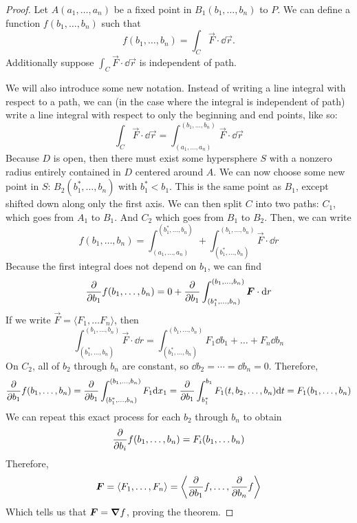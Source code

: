 \begin{proof}
    
    Let $A(a_1, \dots, a_n)$ be a fixed point in $B_1(b_1, \dots, b_n)$ to $P$. We can define a function $f(b_1, \dots, b_n)$ such that
    \[ f(b_1, \dots, b_n) = \int_C \vec F\cdot \dd \vec r.\]
    Additionally suppose $\int_C\vec F \cdot \dd \vec r$ is independent of path. \par 
    We will also introduce some new notation. Instead of writing a line integral with respect to a path, we can (in the case where the integral is independent of path) write a line integral with respect to only the beginning and end points, like so:
    \[ \int_C \vec F \cdot \dd \vec r = \int_{(a_1, \dots, a_n)}^{(b_1, \dots, b_n)}\vec F \cdot \dd \vec r\]
    Because $D$ is open, then there must exist some hypersphere $S$ with a nonzero radius entirely contained in $D$ centered around $A$. We can now choose some new point in $S$: $B_2(b_1^*, \dots, b_n)$ with $b_1^*<b_1$. This is the same point as $B_1$, except shifted down along only the first axis. We can then split $C$ into two paths: $C_1$, which goes from $A_1$ to $B_1$. And $C_2$ which goes from $B_1$ to $B_2$. Then, we can write
    \[ f(b_1, \dots, b_n) = \int_{(a_1, \dots, a_n)}^{(b_1^*, \dots, b_n)} + \int_{(b_1^*, \dots, b_n)}^{(b_1, \dots, b_n)}\vec F \cdot \dd r\]
    Because the first integral does not depend on $b_1$, we can find
    \[ \pdv{b_1}f(b_1, \dots, b_n) = 0 + \pdv{b_1} \int_{(b_1^*, \dots, b_n)}^{(b_1, \dots, b_n)}\boldsymbol{F} \cdot \dd r \]
    If we write $\vec F = \langle F_1, \dots F_n\rangle$, then
    \[  \int_{(b_1^*, \dots, b_n)}^{(b_1, \dots, b_n)}\vec F \cdot \dd r =  \int_{(b_1^*, \dots, b_n)}^{(b_1, \dots, b_n)}F_1\dd b_1 + \dots + F_n\dd b_n\]
    On $C_2$, all of $b_2$ through $b_n$ are constant, so $\dd b_2 = \cdots = \dd b_n = 0$. Therefore,
    \[ \pdv{b_1}f(b_1, \dots, b_n) = \pdv{b_1}\int_{(b_1^*, \dots, b_n)}^{(b_1, \dots, b_n)}F_1\dd x_1 = \pdv{b_1}\int_{b_1^*}^{b_1}F_1(t, b_2, \dots, b_n)\dd t = F_1(b_1, \dots, b_n) \]
    We can repeat this exact process for each $b_2$ through $b_n$ to obtain
    \[ \pdv{b_i}f(b_1, \dots, b_n) = F_i(b_1, \dots b_n)\]
    Therefore, 
    \[ \boldsymbol{F} = \left\langle F_1, \dots, F_n\right\rangle = \left\langle \pdv{b_1} f, \dots, \pdv{b_n} f \right\rangle \]
    Which tells us that $\boldsymbol{F} = \boldsymbol\nabla f$, proving the theorem.
\end{proof}
